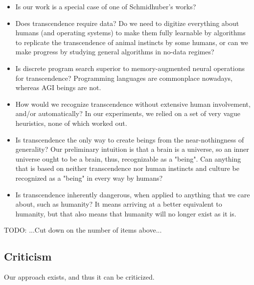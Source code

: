 \documentclass{article}
\begin{document}
\begin{itemize}
\item Is our work is a special case of one of Schmidhuber's works?

\item Does transcendence require data? Do we need to digitize everything about humans (and operating systems) to make them fully learnable by algorithms to replicate the transcendence of animal instincts by some humans, or can we make progress by studying general algorithms in no-data regimes?

\item Is discrete program search superior to memory-augmented neural operations for transcendence? Programming languages are commonplace nowadays, whereas AGI beings are not.

\item How would we recognize transcendence without extensive human involvement, and/or automatically? In our experiments, we relied on a set of very vague heuristics, none of which worked out.

\item Is transcendence the only way to create beings from the near-nothingness of generality? Our preliminary intuition is that a brain is a universe, so an inner universe ought to be a brain, thus, recognizable as a "being". Can anything that is based on neither transcendence nor human instincts and culture be recognized as a "being" in every way by humans?

\item Is transcendence inherently dangerous, when applied to anything that we care about, such as humanity? It means arriving at a better equivalent to humanity, but that also means that humanity will no longer exist as it is.
\end{itemize}

    TODO: ...Cut down on the number of items above...

\subsection{Criticism}

Our approach exists, and thus it can be criticized.
\end{document}
